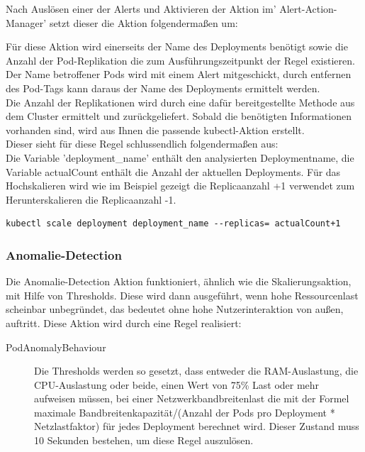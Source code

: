 \documentclass[a4paper,10pt]{scrartcl}
\begin{document}
Nach Auslösen einer der Alerts und Aktivieren der Aktion im' Alert-Action-Manager' setzt dieser die Aktion folgendermaßen um:

Für diese Aktion wird einerseits der Name des Deployments benötigt sowie die Anzahl der Pod-Replikation die zum Ausführungszeitpunkt der Regel existieren.\\
Der Name betroffener Pods wird mit einem Alert mitgeschickt, durch entfernen des Pod-Tags kann daraus der Name des Deployments ermittelt werden.\\
Die Anzahl der Replikationen wird durch eine dafür bereitgestellte Methode aus dem Cluster ermittelt und zurückgeliefert.
Sobald die benötigten Informationen vorhanden sind, wird aus Ihnen die passende kubectl-Aktion erstellt.\\
Dieser sieht für diese Regel schlussendlich folgendermaßen aus:\\
Die Variable 'deployment\_name' enthält den analysierten Deploymentname, die Variable actualCount enthält die Anzahl der aktuellen Deployments.
Für das Hochskalieren wird wie im Beispiel gezeigt die Replicaanzahl +1 verwendet zum Herunterskalieren die Replicaanzahl -1.

\begin{lstlisting}
kubectl scale deployment deployment_name --replicas= actualCount+1
\end{lstlisting}

\subsubsection{Anomalie-Detection}

Die Anomalie-Detection Aktion funktioniert, ähnlich wie die Skalierungsaktion, mit Hilfe von Thresholds. Diese wird dann ausgeführt, wenn hohe Ressourcenlast scheinbar unbegründet, das bedeutet ohne hohe Nutzerinteraktion von außen, auftritt.
Diese Aktion wird durch eine Regel realisiert:

\begin{description}
\item[PodAnomalyBehaviour]
Die Thresholds werden so gesetzt, dass entweder die RAM-Auslastung, die CPU-Auslastung oder beide, einen Wert von 75\% Last oder mehr aufweisen müssen, bei einer Netzwerkbandbreitenlast die mit der Formel maximale Bandbreitenkapazität/(Anzahl der Pods pro Deployment * Netzlastfaktor) für jedes Deployment berechnet wird. Dieser Zustand muss 10 Sekunden bestehen, um diese Regel auszulösen.
\end{description}
\end{document}
